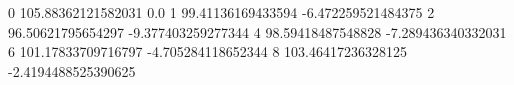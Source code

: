 0 105.88362121582031 0.0
1 99.41136169433594 -6.472259521484375
2 96.50621795654297 -9.377403259277344
4 98.59418487548828 -7.289436340332031
6 101.17833709716797 -4.705284118652344
8 103.46417236328125 -2.4194488525390625
